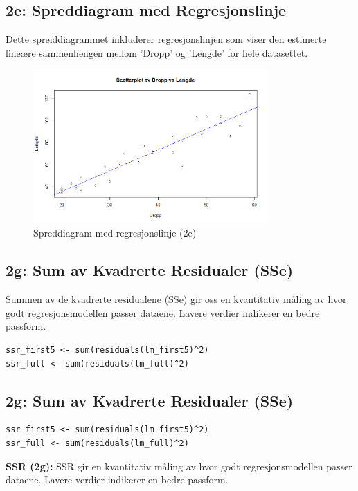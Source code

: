 \documentclass{article}
\begin{document}
\subsection{2e: Spreddiagram med Regresjonslinje}
Dette spreiddiagrammet inkluderer regresjonslinjen som viser den estimerte lineære sammenhengen mellom 'Dropp' og 'Lengde' for hele datasettet.

\begin{figure}[H]
    \centering
    \includegraphics[width=0.8\textwidth]{Rplot02.png}
    \caption{Spreddiagram med regresjonslinje (2e)}
\end{figure}
\subsection{2g: Sum av Kvadrerte Residualer (SSe)}
Summen av de kvadrerte residualene (SSe) gir oss en kvantitativ måling av hvor godt regresjonsmodellen passer dataene. Lavere verdier indikerer en bedre passform.

\begin{lstlisting}[style=Rstyle]
ssr_first5 <- sum(residuals(lm_first5)^2)
ssr_full <- sum(residuals(lm_full)^2)
\end{lstlisting}

\subsection{2g: Sum av Kvadrerte Residualer (SSe)}
\begin{lstlisting}[style=Rstyle]
ssr_first5 <- sum(residuals(lm_first5)^2)
ssr_full <- sum(residuals(lm_full)^2)
\end{lstlisting}

\textbf{SSR (2g):} SSR gir en kvantitativ måling av hvor godt regresjonsmodellen passer dataene. Lavere verdier indikerer en bedre passform.
\end{document}
